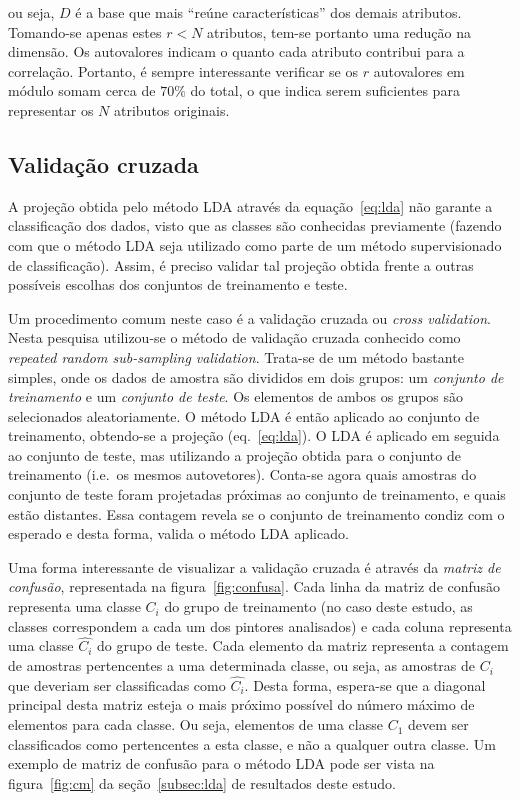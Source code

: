 \noindent ou seja, $D$ é a base que mais ``reúne características'' dos demais
atributos. Tomando-se apenas estes $r < N$ atributos, tem-se portanto uma
redução na dimensão. Os autovalores indicam o quanto cada
atributo contribui para a correlação. Portanto, é sempre interessante verificar se
os $r$ autovalores em módulo somam cerca de $70\%$ do total, o que indica
serem suficientes para representar os $N$ atributos originais.~\cite{luciano}

\subsection{Validação cruzada}

A projeção obtida pelo método LDA através da equação~\ref{eq:lda} não
garante a classificação dos dados, visto que as classes são conhecidas
previamente (fazendo com que o método LDA seja utilizado como parte de
um método supervisionado de classificação). Assim, é preciso validar
tal projeção obtida frente a outras possíveis escolhas dos conjuntos
de treinamento e teste.

Um procedimento comum neste caso é a validação cruzada ou
\textit{cross validation}. Nesta pesquisa utilizou-se o método de validação cruzada conhecido como \textit{repeated random sub-sampling validation}. Trata-se de um método bastante simples,
onde os dados de amostra são divididos em dois grupos: um
\emph{conjunto de treinamento} e um \emph{conjunto de teste}. Os elementos de ambos os grupos são selecionados aleatoriamente. O método
LDA é então aplicado ao conjunto de treinamento, obtendo-se a projeção
(eq.~\ref{eq:lda}). O LDA é aplicado em seguida ao conjunto de teste,
mas utilizando a projeção obtida para o conjunto de treinamento (i.e.\
os mesmos autovetores). Conta-se agora quais amostras do conjunto de
teste foram projetadas próximas ao conjunto de treinamento, e quais
estão distantes. Essa contagem revela se o conjunto de treinamento
condiz com o esperado e desta forma, valida o método LDA aplicado.~\cite{luciano}

Uma forma interessante de visualizar a validação cruzada é através da
\emph{matriz de confusão}, representada na
figura~\ref{fig:confusa}. Cada linha da matriz de confusão representa
uma classe $C_i$ do grupo de treinamento (no caso deste estudo, as
classes correspondem a cada um dos pintores analisados) e cada coluna
representa uma classe $\hat{C_i}$ do grupo de teste. Cada elemento da
matriz representa a contagem de amostras pertencentes a uma
determinada classe, ou seja, as amostras de $C_i$ que deveriam ser
classificadas como $\hat{C_i}$. Desta forma, espera-se que a diagonal
principal desta matriz esteja o mais próximo possível do número máximo
de elementos para cada classe. Ou seja, elementos de uma classe $C_1$
devem ser classificados como pertencentes a esta classe, e não a
qualquer outra classe. Um exemplo de matriz de confusão para o método
LDA pode ser vista na figura~\ref{fig:cm} da seção~\ref{subsec:lda} de
resultados deste estudo.

